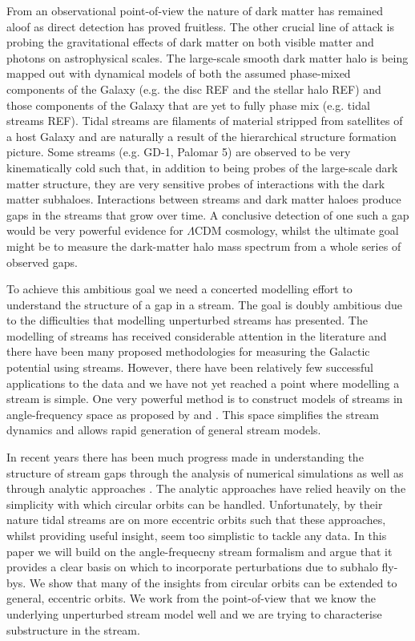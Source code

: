 \documentclass[useAMS,usenatbib,fleqn,a4paper]{mn2e}
\begin{document}
From an observational point-of-view the nature of dark matter has remained aloof as direct detection has proved fruitless. The other crucial line of attack is probing the gravitational effects of dark matter on both visible matter and photons on astrophysical scales. The large-scale smooth dark matter halo is being mapped out with dynamical models of both the assumed phase-mixed components of the Galaxy (e.g. the disc REF and the stellar halo REF) and those components of the Galaxy that are yet to fully phase mix (e.g. tidal streams REF). Tidal streams are filaments of material stripped from satellites of a host Galaxy and are naturally a result of the hierarchical structure formation picture. Some streams (e.g. GD-1, Palomar 5) are observed to be very kinematically cold such that, in addition to being probes of the large-scale dark matter structure, they are very sensitive probes of interactions with the dark matter subhaloes. Interactions between streams and dark matter haloes produce gaps in the streams that grow over time. A conclusive detection of one such a gap would be very powerful evidence for $\Lambda$CDM cosmology, whilst the ultimate goal might be to measure the dark-matter halo mass spectrum from a whole series of observed gaps.

To achieve this ambitious goal we need a concerted modelling effort to understand the structure of a gap in a stream. The goal is doubly ambitious due to the difficulties that modelling unperturbed streams has presented. The modelling of streams has received considerable attention in the literature and there have been many proposed methodologies for measuring the Galactic potential using streams. However, there have been relatively few successful applications to the data \citep{Koposov2010,LawMajewski2010,Gibbons2014,Kuepper2015,Bowden2015} and we have not yet reached a point where modelling a stream is simple. One very powerful method is to construct models of streams in angle-frequency space as proposed by \cite{Bovy2014} and \cite{Sanders2014}. This space simplifies the stream dynamics \citep{HelmiWhite1999,Tremaine1999} and allows rapid generation of general stream models.

In recent years there has been much progress made in understanding the structure of stream gaps through the analysis of numerical simulations \citep{SiegalGaskins2008,Carlberg2009,YoonJohnstonHogg,Carlberg2012} as well as through analytic approaches \citep{Carlberg2013,ErkalBelokurov2015,ErkalBelokurov2015b}. The analytic approaches have relied heavily on the simplicity with which circular orbits can be handled. Unfortunately, by their nature tidal streams are on more eccentric orbits such that these approaches, whilst providing useful insight, seem too simplistic to tackle any data. In this paper we will build on the angle-frequecny stream formalism and argue that it provides a clear basis on which to incorporate perturbations due to subhalo fly-bys. We show that many of the insights from circular orbits can be extended to general, eccentric orbits. We work from the point-of-view that we know the underlying unperturbed stream model well and we are trying to characterise substructure in the stream.
\end{document}
